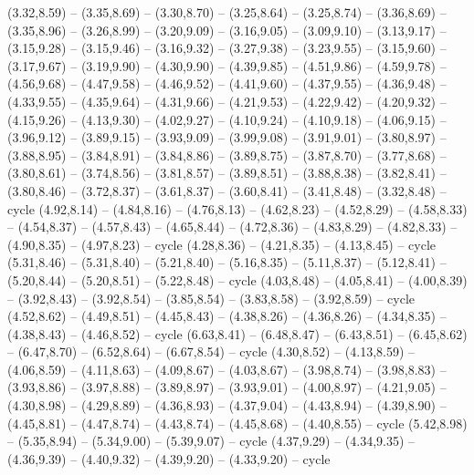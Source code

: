 \expandafter\def\csname geo:gebiet:heute-DNK\endcsname{
  (3.32,8.59) -- (3.35,8.69) -- (3.30,8.70) -- (3.25,8.64) -- (3.25,8.74) -- (3.36,8.69) -- (3.35,8.96) -- (3.26,8.99) -- (3.20,9.09) -- (3.16,9.05) -- (3.09,9.10) -- (3.13,9.17) -- (3.15,9.28) -- (3.15,9.46) -- (3.16,9.32) -- (3.27,9.38) -- (3.23,9.55) -- (3.15,9.60) -- (3.17,9.67) -- (3.19,9.90) -- (4.30,9.90) -- (4.39,9.85) -- (4.51,9.86) -- (4.59,9.78) -- (4.56,9.68) -- (4.47,9.58) -- (4.46,9.52) -- (4.41,9.60) -- (4.37,9.55) -- (4.36,9.48) -- (4.33,9.55) -- (4.35,9.64) -- (4.31,9.66) -- (4.21,9.53) -- (4.22,9.42) -- (4.20,9.32) -- (4.15,9.26) -- (4.13,9.30) -- (4.02,9.27) -- (4.10,9.24) -- (4.10,9.18) -- (4.06,9.15) -- (3.96,9.12) -- (3.89,9.15) -- (3.93,9.09) -- (3.99,9.08) -- (3.91,9.01) -- (3.80,8.97) -- (3.88,8.95) -- (3.84,8.91) -- (3.84,8.86) -- (3.89,8.75) -- (3.87,8.70) -- (3.77,8.68) -- (3.80,8.61) -- (3.74,8.56) -- (3.81,8.57) -- (3.89,8.51) -- (3.88,8.38) -- (3.82,8.41) -- (3.80,8.46) -- (3.72,8.37) -- (3.61,8.37) -- (3.60,8.41) -- (3.41,8.48) -- (3.32,8.48) -- cycle
  (4.92,8.14) -- (4.84,8.16) -- (4.76,8.13) -- (4.62,8.23) -- (4.52,8.29) -- (4.58,8.33) -- (4.54,8.37) -- (4.57,8.43) -- (4.65,8.44) -- (4.72,8.36) -- (4.83,8.29) -- (4.82,8.33) -- (4.90,8.35) -- (4.97,8.23) -- cycle
  (4.28,8.36) -- (4.21,8.35) -- (4.13,8.45) -- cycle
  (5.31,8.46) -- (5.31,8.40) -- (5.21,8.40) -- (5.16,8.35) -- (5.11,8.37) -- (5.12,8.41) -- (5.20,8.44) -- (5.20,8.51) -- (5.22,8.48) -- cycle
  (4.03,8.48) -- (4.05,8.41) -- (4.00,8.39) -- (3.92,8.43) -- (3.92,8.54) -- (3.85,8.54) -- (3.83,8.58) -- (3.92,8.59) -- cycle
  (4.52,8.62) -- (4.49,8.51) -- (4.45,8.43) -- (4.38,8.26) -- (4.36,8.26) -- (4.34,8.35) -- (4.38,8.43) -- (4.46,8.52) -- cycle
  (6.63,8.41) -- (6.48,8.47) -- (6.43,8.51) -- (6.45,8.62) -- (6.47,8.70) -- (6.52,8.64) -- (6.67,8.54) -- cycle
  (4.30,8.52) -- (4.13,8.59) -- (4.06,8.59) -- (4.11,8.63) -- (4.09,8.67) -- (4.03,8.67) -- (3.98,8.74) -- (3.98,8.83) -- (3.93,8.86) -- (3.97,8.88) -- (3.89,8.97) -- (3.93,9.01) -- (4.00,8.97) -- (4.21,9.05) -- (4.30,8.98) -- (4.29,8.89) -- (4.36,8.93) -- (4.37,9.04) -- (4.43,8.94) -- (4.39,8.90) -- (4.45,8.81) -- (4.47,8.74) -- (4.43,8.74) -- (4.45,8.68) -- (4.40,8.55) -- cycle
  (5.42,8.98) -- (5.35,8.94) -- (5.34,9.00) -- (5.39,9.07) -- cycle
  (4.37,9.29) -- (4.34,9.35) -- (4.36,9.39) -- (4.40,9.32) -- (4.39,9.20) -- (4.33,9.20) -- cycle
}

